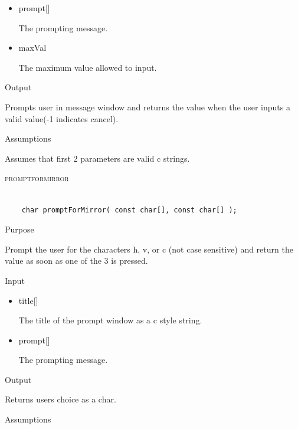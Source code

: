 \documentclass[pdftex, 11pt]{article}
\begin{document}
\begin{description}
\begin{description}
\begin{itemize}
					\item{prompt[]}

						The prompting message.

					\item{maxVal}

						The maximum value allowed to input.

				\end{itemize}

			\item{Output}

				Prompts user in message window and returns the value when
				the user inputs a valid value(-1 indicates cancel).

			\item{Assumptions}

				Assumes that first 2 parameters are valid c strings.

		\end{description}


	\item{\textsc{promptformirror}}

		\begin{lstlisting}

	char promptForMirror( const char[], const char[] );
		\end{lstlisting}

		\begin{description}
			\item{Purpose}

				Prompt the user for the characters h, v, or c (not case sensitive) and return
				the value as soon as one of the 3 is pressed.

			\item{Input}

				\begin{itemize}
					
					\item{title[]}

						The title of the prompt window as a c style string.

					\item{prompt[]}

						The prompting message.

				\end{itemize}

			\item{Output}

				Returns users choice as a char.

			\item{Assumptions}


\end{description}
\end{description}
\end{document}
